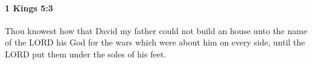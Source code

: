 
		\paragraph{1 Kings 5:3} %
			\label{1KINGS-5-3}

			Thou knowest how that David my father could not build an house unto the name of the LORD his God for the wars which were about him on every side, until the LORD put them under the soles of his feet.



